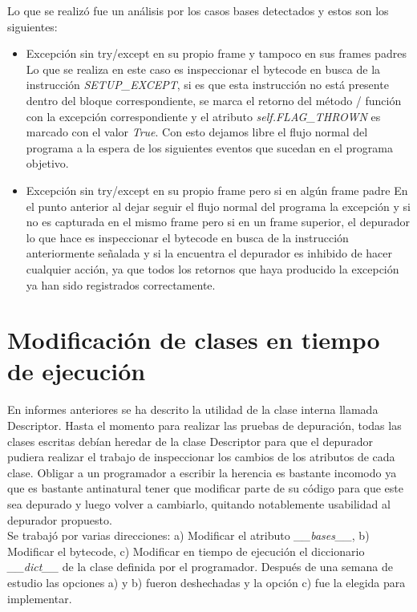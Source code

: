 \documentclass[10pt,a4paper]{article}
\begin{document}
Lo que se realizó fue un análisis por los casos bases detectados y estos son los siguientes:

\begin{itemize}
\item Excepción sin try/except en su propio frame y tampoco en sus frames padres
Lo que se realiza en este caso es inspeccionar el bytecode en busca de la instrucción \textit{SETUP\_EXCEPT}, si es que esta instrucción no está presente dentro del bloque correspondiente, se marca el retorno del método / función con la excepción correspondiente y el atributo \textit{self.FLAG\_THROWN} es marcado con el valor \textit{True}.  Con esto dejamos libre el flujo normal del programa a la espera de los siguientes eventos que sucedan en el programa objetivo.

\item Excepción sin try/except en su propio frame pero si en algún frame padre
En el punto anterior al dejar seguir el flujo normal del programa la excepción y si no es capturada en el mismo frame pero si en un frame superior, el depurador lo que hace es inspeccionar el bytecode en busca de la instrucción anteriormente señalada y si la encuentra el depurador es inhibido de hacer cualquier acción, ya que todos los retornos que haya producido la excepción ya han sido registrados correctamente.

\end{itemize}
\newpage

\section{Modificación de clases en tiempo de ejecución}

En informes anteriores se ha descrito la utilidad de la clase interna llamada Descriptor.  Hasta el momento para realizar las pruebas de depuración, todas las clases escritas debían heredar de la clase Descriptor para que el depurador pudiera realizar el trabajo de inspeccionar los cambios de los atributos de cada clase.  Obligar a un programador a escribir la herencia es bastante incomodo ya que es bastante antinatural tener que modificar parte de su código para que este sea depurado y luego volver a cambiarlo, quitando notablemente usabilidad al depurador propuesto.\\

Se trabajó por varias direcciones: a) Modificar el atributo \textit{\_\_bases\_\_}, b) Modificar el bytecode, c) Modificar en tiempo de ejecución el diccionario \textit{\_\_dict\_\_} de la clase definida por el programador.  Después de una semana de estudio las opciones a) y b) fueron deshechadas y la opción c) fue la elegida para implementar.\\
\end{document}
